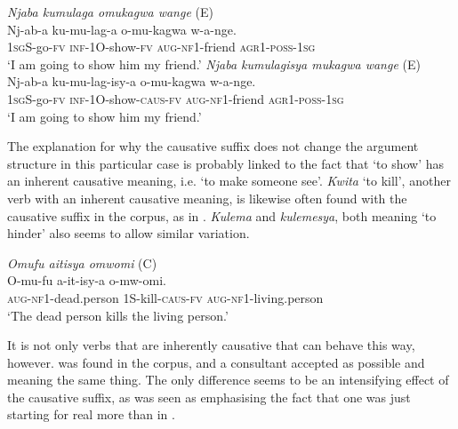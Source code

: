 \documentclass[output=paper,colorlinks,citecolor=brown,draftmode]{langscibook}
\begin{document}
\ea
\begin{xlist}   \label{ex:Saebo:show}
 \ex \label{ex:Saebo:showA} \emph{Njaba kumulaga omukagwa wange } (E)\\
  \gll  Nj-ab-a ku-mu-lag-a o-mu-kagwa w-a-nge. \\ 
\textsc{1sg}S-go-\textsc{fv} \textsc{inf-}1O-show-\textsc{fv} \textsc{aug-nf1}-friend \textsc{agr1-poss-1sg}\\
    \glt  `I am going to show him my friend.' 
     \ex \label{ex:Saebo:showB} \emph{Njaba kumulagisya mukagwa wange } (E)\\
  \gll  Nj-ab-a ku-mu-lag-isy-a o-mu-kagwa w-a-nge. \\ 
\textsc{1sg}S-go-\textsc{fv} \textsc{inf-}1O-show-\textsc{caus-fv} \textsc{aug-nf1}-friend \textsc{agr1-poss-1sg} \\
    \glt  `I am going to show him my friend.' 
      \end{xlist}     
      \z
The explanation for why the causative suffix does not change the argument structure in this particular case is probably linked to the fact that `to show' has an inherent causative meaning, i.e. `to make someone see'. \emph{Kwita} `to kill', another verb with an inherent causative meaning, is likewise often found with the causative suffix in the corpus, as in . \emph{Kulema}  and \emph{kulemesya}, both meaning `to hinder' also seems to allow similar variation. 

\ea \label{ex:Saebo:kill} \emph{Omufu aitisya omwomi} (C)\\
  \gll  O-mu-fu a-it-isy-a o-mw-omi. \\ 
\textsc{aug-nf1}-dead.person 1S-kill-\textsc{caus-fv}  \textsc{aug-nf1}-living.person\\
    \glt  `The dead person kills the living person.' 
      \z

It is not only verbs that are inherently causative that can behave this way, however.  was found in the corpus, and a consultant accepted  as possible and meaning the same thing. The only difference seems to be an intensifying effect of the causative suffix, as   was seen as emphasising the fact that one was just starting for real more than in .
\end{document}
